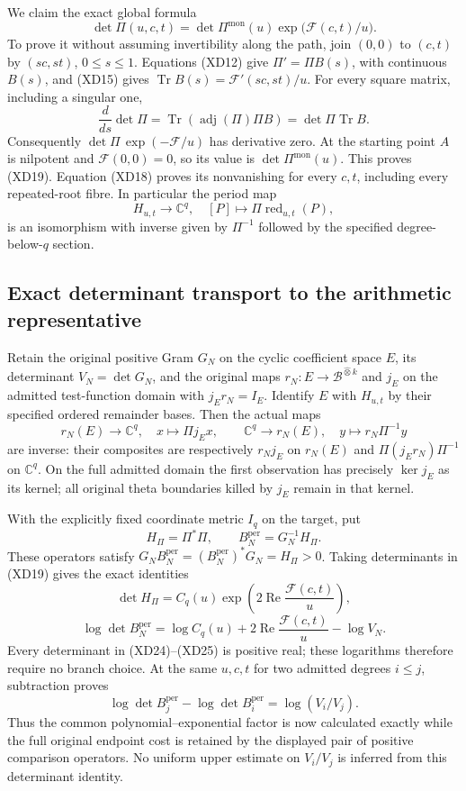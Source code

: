 We claim the exact global formula
\[
 \boxed{\det\Pi(u,c,t)=\det\Pi^{\mathrm{mon}}(u)
                 \exp\bigl(\mathcal F(c,t)/u\bigr).}
 \tag{XD19}
\]
To prove it without assuming invertibility along the path, join
$(0,0)$ to $(c,t)$ by $(sc,st)$, $0\leq s\leq1$.
Equations (XD12) give $\Pi'=\Pi B(s)$, with continuous $B(s)$,
and (XD15) gives $\operatorname{Tr}B(s)=\mathcal F'(sc,st)/u$.
For every square matrix, including a singular one,
\[
 \frac{d}{ds}\det\Pi
 =\operatorname{Tr}(\operatorname{adj}(\Pi)\Pi B)
 =\det\Pi\operatorname{Tr}B.
 \tag{XD20}
\]
Consequently $\det\Pi\,\exp(-\mathcal F/u)$ has derivative zero.
At the starting point $A$ is nilpotent and $\mathcal F(0,0)=0$,
so its value is $\det\Pi^{\mathrm{mon}}(u)$. This proves (XD19).
Equation (XD18) proves its nonvanishing for every $c,t$, including
every repeated-root fibre. In particular the period map
\[
 H_{u,t}\longrightarrow\mathbb C^q,
 \quad[P]\longmapsto\Pi\operatorname{red}_{u,t}(P),
 \tag{XD21}
\]
is an isomorphism with inverse given by $\Pi^{-1}$ followed by
the specified degree-below-$q$ section.

\subsection{Exact determinant transport to the arithmetic representative}

Retain the original positive Gram $G_N$ on the cyclic coefficient
space $E$, its determinant $V_N=\det G_N$, and the original maps
$r_N:E\longrightarrow\mathscr B^{\widehat\otimes k}$ and
$j_E$ on the admitted test-function domain with $j_Er_N=I_E$.
Identify $E$ with $H_{u,t}$ by their specified ordered remainder
bases. Then the actual maps
\[
 r_N(E)\longrightarrow\mathbb C^q,\quad x\longmapsto\Pi j_Ex,
 \qquad
 \mathbb C^q\longrightarrow r_N(E),\quad y\longmapsto r_N\Pi^{-1}y
 \tag{XD22}
\]
are inverse: their composites are respectively $r_Nj_E$ on
$r_N(E)$ and $\Pi(j_Er_N)\Pi^{-1}$ on $\mathbb C^q$.
On the full admitted domain the first observation has precisely
$\ker j_E$ as its kernel; all original theta boundaries killed by
$j_E$ remain in that kernel.

With the explicitly fixed coordinate metric $I_q$ on the target,
put
\[
 H_\Pi=\Pi^*\Pi,\qquad B_N^{\mathrm{per}}=G_N^{-1}H_\Pi.
 \tag{XD23}
\]
These operators satisfy
$G_NB_N^{\mathrm{per}}=(B_N^{\mathrm{per}})^*G_N=H_\Pi>0$.
Taking determinants in (XD19) gives the exact identities
\[
 \det H_\Pi=C_q(u)
       \exp\!\left(2\operatorname{Re}\frac{\mathcal F(c,t)}u\right),
 \tag{XD24}
\]
\[
 \boxed{\log\det B_N^{\mathrm{per}}
 =\log C_q(u)+2\operatorname{Re}\frac{\mathcal F(c,t)}u-\log V_N.}
 \tag{XD25}
\]
Every determinant in (XD24)--(XD25) is positive real; these
logarithms therefore require no branch choice. At the same $u,c,t$
for two admitted degrees $i\leq j$, subtraction proves
\[
 \boxed{\log\det B_j^{\mathrm{per}}-
        \log\det B_i^{\mathrm{per}}=\log(V_i/V_j).}
 \tag{XD26}
\]
Thus the common polynomial--exponential factor is now calculated
exactly while the full original endpoint cost is retained by the
displayed pair of positive comparison operators. No uniform upper
estimate on $V_i/V_j$ is inferred from this determinant identity.

